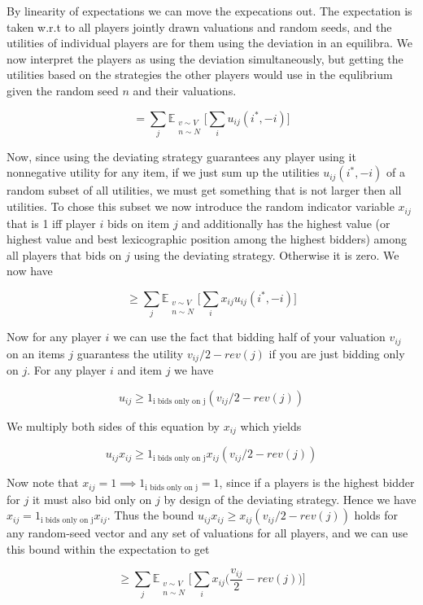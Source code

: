 By linearity of expectations we can move the expecations out. The expectation is taken w.r.t to all players jointly drawn valuations and random seeds, and the utilities of individual players are for them using the deviation in an equilibra. We now interpret the players as using the deviation simultaneously, but getting the utilities based on the strategies the other players would use in the equlibrium given the random seed $n$ and their valuations.

$$
= \sum_j  \mathbb{E}_{ \substack{ v \sim V \\ n \sim N }} \bigg[ \sum_i   u_{ij}(i^*, -i)  \bigg]
$$


Now, since using the deviating strategy guarantees any player using it nonnegative utility for any item, if we just sum up the utilities $u_{ij}(i^*, -i)$ of a random subset of all utilities, we must get something that is not larger then all utilities. To chose this subset we now introduce the random indicator variable $x_{ij}$ that is 1 iff player $i$ bids on item $j$ and additionally has the highest value (or highest value and best lexicographic position among the highest bidders) among all players that bids on $j$ using the deviating strategy. Otherwise it is zero. We now have

$$
\ge \sum_j  \mathbb{E}_{ \substack{ v \sim V \\ n \sim N }} \bigg[ \sum_i  x_{ij} u_{ij}(i^*, -i)  \bigg]
$$

Now for any player $i$ we can use the fact that bidding half of your valuation $v_{ij}$ on an items $j$ guarantess the utility $v_{ij}/2 - rev(j)$ if you are just bidding only on $j$. For any player $i$ and item $j$ we have

$$
u_{ij} \ge 1_{\textrm{i bids only on j}} (v_{ij}/2 - rev(j))
$$

We multiply both sides of this equation by $x_{ij}$ which yields

$$
u_{ij} x_{ij} \ge 1_{\textrm{i bids only on j}} x_{ij} (v_{ij}/2 - rev(j))
$$

Now note that $x_{ij}=1 \implies 1_{\textrm{i bids only on j}} = 1$, since if a players is the highest bidder for $j$ it must also bid only on $j$ by design of the deviating strategy. Hence we have $x_{ij}= 1_{\textrm{i bids only on j}} x_{ij}$. Thus the bound $u_{ij} x_{ij} \ge x_{ij} (v_{ij}/2 - rev(j))$ holds for any random-seed vector and any set of valuations for all players, and we can use this bound within the expectation to get

$$
\ge \sum_j  \mathbb{E}_{ \substack{ v \sim V \\ n \sim N }} \bigg[ \sum_i  x_{ij} \bigg( \frac{v_{ij}}{2} - rev(j) \bigg) \bigg]
$$

